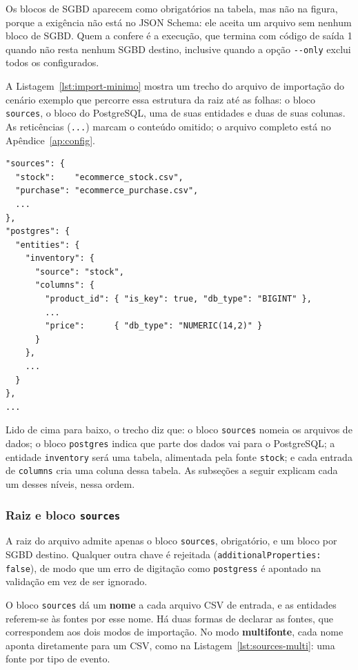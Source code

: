 Os blocos de SGBD aparecem como obrigatórios na tabela, mas não na figura, porque a
exigência não está no JSON Schema: ele aceita um arquivo sem nenhum bloco de SGBD. Quem
a confere é a execução, que termina com código de saída 1 quando não resta nenhum SGBD
destino, inclusive quando a opção \texttt{-{}-only} exclui todos os configurados.

A Listagem~\ref{lst:import-minimo} mostra um trecho do arquivo de importação do cenário
exemplo que percorre essa estrutura da raiz até as folhas: o bloco \texttt{sources}, o bloco do
PostgreSQL, uma de suas entidades e duas de suas colunas. As reticências (\texttt{...})
marcam o conteúdo omitido; o arquivo completo está no Apêndice~\ref{ap:config}.

\begin{lstlisting}[style=jsonstyle,caption={Trecho do arquivo de importação, da raiz até as colunas.},label={lst:import-minimo}]
"sources": {
  "stock":    "ecommerce_stock.csv",
  "purchase": "ecommerce_purchase.csv",
  ...
},
"postgres": {
  "entities": {
    "inventory": {
      "source": "stock",
      "columns": {
        "product_id": { "is_key": true, "db_type": "BIGINT" },
        ...
        "price":      { "db_type": "NUMERIC(14,2)" }
      }
    },
    ...
  }
},
...
\end{lstlisting}

Lido de cima para baixo, o trecho diz que: o bloco \texttt{sources} nomeia os arquivos de
dados; o bloco \texttt{postgres} indica que parte dos dados vai para o PostgreSQL; a
entidade \texttt{inventory} será uma tabela, alimentada pela fonte \texttt{stock}; e cada
entrada de \texttt{columns} cria uma coluna dessa tabela. As subseções a seguir explicam
cada um desses níveis, nessa ordem.

\subsubsection{Raiz e bloco \texttt{sources}}
\label{sec:sources}

A raiz do arquivo admite apenas o bloco \texttt{sources}, obrigatório, e um bloco por SGBD
destino. Qualquer outra chave é rejeitada (\texttt{additionalProperties: false}), de
modo que um erro de digitação como \texttt{postgress} é apontado na validação em vez de
ser ignorado.

O bloco \texttt{sources} dá um \textbf{nome} a cada arquivo CSV de entrada, e as entidades
referem-se às fontes por esse nome. Há duas formas de declarar as fontes, que
correspondem aos dois modos de importação. No modo \textbf{multifonte}, cada nome aponta
diretamente para um CSV, como na Listagem~\ref{lst:sources-multi}: uma fonte por tipo de
evento.


